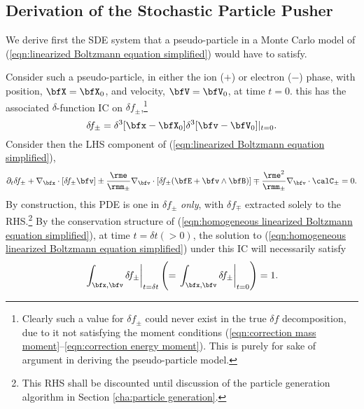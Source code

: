 \subsection{Derivation of the Stochastic Particle Pusher}\label{cha:particle pusher}
    We derive first the SDE system that a pseudo-particle in a Monte Carlo model of (\ref{eqn:linearized Boltzmann equation simplified}) would have to satisfy.


    Consider such a pseudo-particle, in either the ion ($+$) or electron ($-$) phase, with position, $\bfX  =  \bfX_{0}$, and velocity, $\bfV  =  \bfV_{0}$, at time $t  =  0$. this has the associated $\delta$-function IC on $\delta\!f_{\pm}$,\footnote{Clearly such a value for $\delta\!f_{\pm}$ could never exist in the true $\delta\!f$ decomposition, due to it not satisfying the moment conditions (\ref{eqn:correction mass moment}--\ref{eqn:correction energy moment}). This is purely for sake of argument in deriving the pseudo-particle model.}
    \begin{equation}
        \delta\!f_{\pm}  =  \delta^{3}[\bfx - \bfX_{0}]\delta^{3}[\bfv - \bfV_{0}]|_{t = 0}.
    \end{equation}
    Consider then the LHS component of (\ref{eqn:linearized Boltzmann equation simplified}),
    \begin{equation}\label{eqn:homogeneous linearized Boltzmann equation simplified}
        \partial_{t}\delta\!f_{\pm} + \nabla_{\bfx}\cdot[\delta\!f_{\pm}\bfv] \pm \frac{\rme}{\rmm_{\pm}}\nabla_{\bfv}\cdot[\delta\!f_{\pm}(\bfE + \bfv\wedge\bfB)] \mp \frac{\rme^{2}}{\rmm_{\pm}}\nabla_{\bfv}\cdot\calC_{\pm}  =  0.
    \end{equation}
    By construction, this PDE is one in $\delta\!f_{\pm}$ \emph{only}, with $\delta\!f_{\mp}$ extracted solely to the RHS.\footnote{This RHS shall be discounted until discussion of the particle generation algorithm in Section \ref{cha:particle generation}.} By the conservation structure of (\ref{eqn:homogeneous linearized Boltzmann equation simplified}), at time $t = \delta t (> 0)$, the solution to (\ref{eqn:homogeneous linearized Boltzmann equation simplified}) under this IC will necessarily satisfy
    \begin{equation}
        \left.\int_{\bfx, \bfv}\delta\!f_{\pm}\right|_{t = \delta t}  \left(=  \left.\int_{\bfx, \bfv}\delta\!f_{\pm}\right|_{t = 0}\right)  =  1.
    \end{equation}
